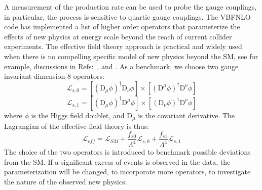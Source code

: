 A measurement
of the production rate can be used to probe the gauge couplings, in
particular, the process is sensitive to quartic gauge couplings. The
{\sc VBFNLO } code has implemented a list of higher order operators
that parameterize the effects of new physics at energy scale beyond
the reach of current collider experiments.  The effective field theory
approach is practical and widely used when there is no compelling
specific model of new physics beyond the SM, see for example,
discussions in Refs:~\cite{Hagiwara:1993ck}, \cite{Buchmuller:1985jz}
and \cite{Eboli:2006wa}.  As a benchmark, we choose two gauge
invariant dimension-8 operators:
\begin{equation}
\mathcal{L}_{s,0} = [(\mathrm{D}_\mu\phi)^\dag\mathrm{D}_\nu \phi]\times [(\mathrm{D}^\mu\phi)^\dag\mathrm{D}^\nu \phi]
\end{equation}
\begin{equation}
\mathcal{L}_{s,1} = [(\mathrm{D}_\mu\phi)^\dag\mathrm{D}^\mu \phi]\times [(\mathrm{D}_\nu\phi)^\dag\mathrm{D}^\nu \phi]
\end{equation}
where $\phi$ is the Higgs field doublet, and $\mathrm{D}_\mu$ is the covariant derivative. 
The Lagrangian of the effective field theory is thus: 
\begin{equation}
\mathcal{L}_{eff} = \mathcal{L}_{SM} + \frac{f_{s0}}{\Lambda^4}\mathcal{L}_{s,0}+\frac{f_{s1}}{\Lambda^4}\mathcal{L}_{s,1}
\end{equation}
The choice of the two operators is introduced to benchmark possible
deviations from the SM. If a significant excess of events is 
observed in the data, the parameterization will be changed, to incorporate 
more operators, to
investigate the nature of the observed new physics.




